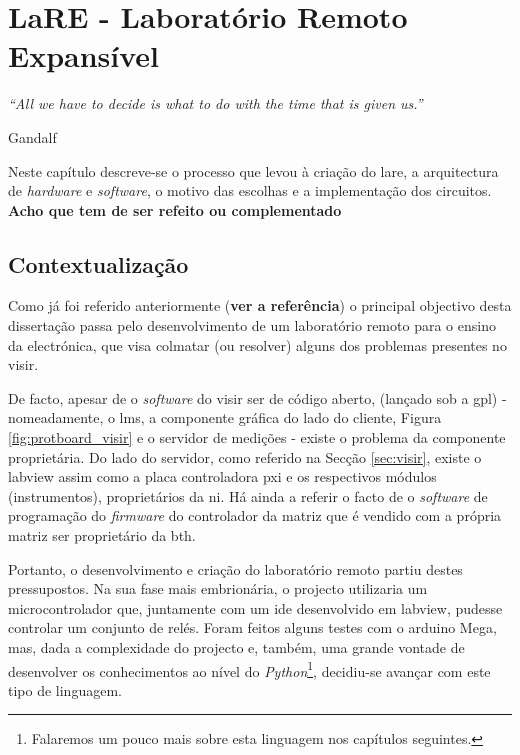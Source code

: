 \chapter{LaRE - Laboratório Remoto Expansível}
\label{Capítulo3}
\begin{center}
    \textit{``All we have to decide is what to do with the time that is given us.''}
     
     Gandalf
\end{center}

Neste capítulo descreve-se o processo que levou à criação do \acrshort{lare}, a arquitectura de \textit{hardware} e \textit{software}, o motivo das escolhas e a implementação dos circuitos. \textbf{Acho que tem de ser refeito ou complementado}

\section{Contextualização}
\label{sec:contextualização}
Como já foi referido anteriormente (\textbf{ver a referência}) o principal objectivo desta dissertação passa pelo desenvolvimento de um \acrshort{laboratório remoto} para o ensino da electrónica, que visa colmatar (ou resolver) alguns dos problemas presentes no \acrshort{visir}.

De facto, apesar de o \textit{software} do \acrshort{visir} ser de código aberto, (lançado sob a \acrshort{gpl}) - nomeadamente, o \acrshort{lms}, a componente gráfica do lado do cliente, Figura \ref{fig:protboard_visir} e o servidor de medições \cite{tawfikdcdc} - existe o problema da componente proprietária. Do lado do servidor, como referido na Secção \ref{sec:visir}, existe o \acrshort{labview} assim como a placa controladora \acrshort{pxi} e os respectivos módulos (instrumentos), proprietários da \acrshort{ni}. Há ainda a referir o facto de o \textit{software} de programação do \textit{firmware} do controlador da matriz que é vendido com a própria matriz ser proprietário da \acrshort{bth}.

Portanto, o desenvolvimento e criação do \acrshort{laboratório remoto} partiu destes pressupostos. Na sua fase mais embrionária, o projecto utilizaria um microcontrolador que, juntamente com um \acrfull{ide} desenvolvido em \acrshort{labview}, pudesse controlar um conjunto de relés. Foram feitos alguns testes com o \gls{arduino} Mega, mas, dada a complexidade do projecto e, também, uma grande vontade de desenvolver os conhecimentos ao nível do \textit{Python}\footnote{Falaremos um pouco mais sobre esta linguagem nos capítulos seguintes.}, decidiu-se avançar com este tipo de linguagem.

